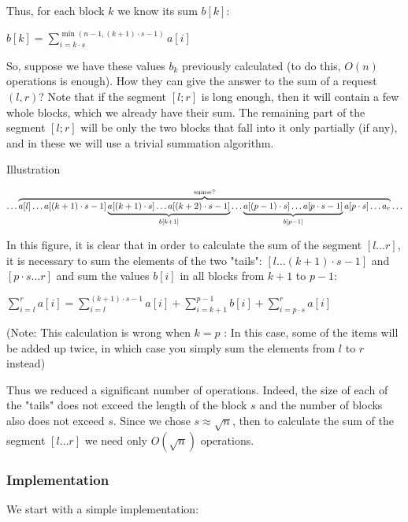 Thus, for each block $k$ we know its sum $b [k]$:

$b[k]=\sum_{i=k\cdot s}^{\min(n-1,(k+1)\cdot s-1)}a[i]$

So, suppose we have these values $b_k$ previously calculated (to do this, $O (n)$ operations is enough). How they can give the answer to the sum of a request $(l, r)$? Note that if the segment $[l; r]$ is long enough, then it will contain a few whole blocks, which we already have their sum. The remaining part of the segment $[l; r]$ will be only the two blocks that fall into it only partially (if any), and in these we will use a trivial summation algorithm.

Illustration

$\ldots\overbrace{a[l]\ldots a[(k+1)\cdot s-1]\underbrace{a[(k+1)\cdot s]\ldots a[(k+2)\cdot s-1]}_{b[k+1]}\ldots\underbrace{a[(p-1)\cdot s]\ldots a[p\cdot s-1]}_{b[p-1]}a[p\cdot s]\ldots a_{r}}^{{\rm sum=?}}\ldots$

In this figure, it is clear that in order to calculate the sum of the segment $[l \ldots r]$, it is necessary to sum the elements of the two "tails": $[l \ldots (k +1) \cdot s-1]$ and $[p \cdot s \ldots r]$ and sum the values $b [i]$ in all blocks from $k +1$ to $p-1$:

$\sum_{i=l}^{r}a[i]=\sum_{i=l}^{(k+1)\cdot s-1}a[i]+\sum_{i=k+1}^{p-1}b[i]+\sum_{i=p\cdot s}^{r}a[i]$

(Note: This calculation is wrong when $k = p$ : In this case, some of the items will be added up twice, in which case you simply sum the elements from $l$ to $r$ instead)

Thus we reduced a significant number of operations. Indeed, the size of each of the "tails" does not exceed the length of the block $s$ and the number of blocks also does not exceed $s$. Since we chose $s \approx \sqrt {n}$, then to calculate the sum of the segment $[l \ldots r]$ we need only $O (\sqrt {n})$ operations.

\subsubsection{ Implementation }

We start with a simple implementation:

